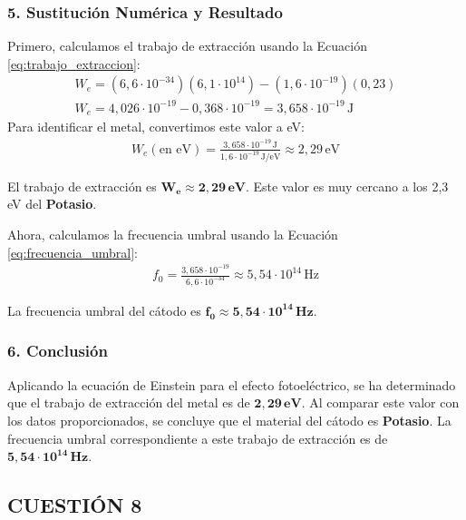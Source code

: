 \subsubsection*{5. Sustitución Numérica y Resultado}
Primero, calculamos el trabajo de extracción usando la Ecuación \ref{eq:trabajo_extraccion}:
\begin{gather}
    W_e = (6,6 \cdot 10^{-34})(6,1 \cdot 10^{14}) - (1,6 \cdot 10^{-19})(0,23) \nonumber \\
    W_e = 4,026 \cdot 10^{-19} - 0,368 \cdot 10^{-19} = 3,658 \cdot 10^{-19} \, \text{J}
\end{gather}
Para identificar el metal, convertimos este valor a eV:
\begin{gather}
    W_e (\text{en eV}) = \frac{3,658 \cdot 10^{-19} \, \text{J}}{1,6 \cdot 10^{-19} \, \text{J/eV}} \approx 2,29 \, \text{eV}
\end{gather}
\begin{cajaresultado}
    El trabajo de extracción es $\boldsymbol{W_e \approx 2,29 \, \textbf{eV}}$. Este valor es muy cercano a los 2,3 eV del \textbf{Potasio}.
\end{cajaresultado}
\medskip
Ahora, calculamos la frecuencia umbral usando la Ecuación \ref{eq:frecuencia_umbral}:
\begin{gather}
    f_0 = \frac{3,658 \cdot 10^{-19}}{6,6 \cdot 10^{-34}} \approx 5,54 \cdot 10^{14} \, \text{Hz}
\end{gather}
\begin{cajaresultado}
    La frecuencia umbral del cátodo es $\boldsymbol{f_0 \approx 5,54 \cdot 10^{14} \, \textbf{Hz}}$.
\end{cajaresultado}

\subsubsection*{6. Conclusión}
\begin{cajaconclusion}
    Aplicando la ecuación de Einstein para el efecto fotoeléctrico, se ha determinado que el trabajo de extracción del metal es de $\mathbf{2,29 \, eV}$. Al comparar este valor con los datos proporcionados, se concluye que el material del cátodo es \textbf{Potasio}. La frecuencia umbral correspondiente a este trabajo de extracción es de $\mathbf{5,54 \cdot 10^{14} \, Hz}$.
\end{cajaconclusion}

\newpage

\subsection{CUESTIÓN 8}
\label{subsec:C8_2022_jun_ord}

